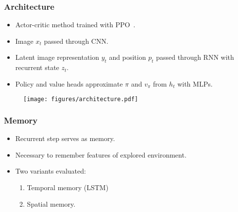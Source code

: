\begin{frame}
    \frametitle{Architecture}

    \begin{itemize}
        \item Actor-critic method trained with PPO~\cite{schulman_proximal_2017}.
        \item Image \(x_t\) passed through CNN.
        \item Latent image representation \(y_t\) and position \(p_t\) passed through RNN with recurrent state \(z_t\).
        \item Policy and value heads approximate \(\pi\) and \(v_\pi\) from \(h_t\) with MLPs.
    \end{itemize}

    \begin{figure}
        \centering
        \texttt{[image: figures/architecture.pdf]}
    \end{figure}
\end{frame}

\begin{frame}
    \frametitle{Memory}

    \begin{itemize}
        \item Recurrent step serves as memory.
        \item Necessary to remember features of explored environment.
        \item Two variants evaluated:
        \begin{enumerate}
            \item Temporal memory (LSTM)
            \item Spatial memory.
        \end{enumerate}
    \end{itemize}
\end{frame}

